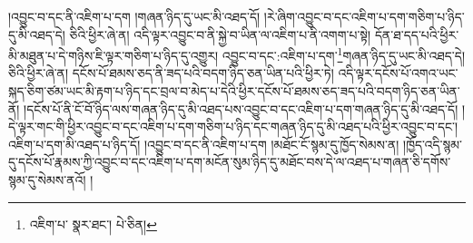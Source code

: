 །འབྱུང་བ་དང་ནི་འཇིག་པ་དག །གཞན་ཉིད་དུ་ཡང་མི་འཐད་དོ། །རེ་ཞིག་འབྱུང་བ་དང་འཇིག་པ་དག་གཅིག་པ་ཉིད་དུ་མི་འཐད་དེ། ཅིའི་ཕྱིར་ཞེ་ན། འདི་ལྟར་འབྱུང་བ་ནི་སྐྱེ་བ་ཡིན་ལ་འཇིག་པ་ནི་འགག་པ་སྟེ། དོན་ཐ་དད་པའི་ཕྱིར་མི་མཐུན་པ་དེ་གཉིས་ཇི་ལྟར་གཅིག་པ་ཉིད་དུ་འགྱུར། འབྱུང་བ་དང་:འཇིག་པ་དག་\footnote{འཇིག་པ་  སྣར་ཐང་།  པེ་ཅིན། }གཞན་ཉིད་དུ་ཡང་མི་འཐད་དེ། ཅིའི་ཕྱིར་ཞེ་ན། དངོས་པོ་ཐམས་ཅད་ནི་ཟད་པའི་བདག་ཉིད་ཅན་ཡིན་པའི་ཕྱིར་ཏེ། འདི་ལྟར་དངོས་པོ་འགའ་ཡང་སྐད་ཅིག་ཙམ་ཡང་མི་རྟག་པ་ཉིད་དང་བྲལ་བ་མེད་པ་དེའི་ཕྱིར་དངོས་པོ་ཐམས་ཅད་ཟད་པའི་བདག་ཉིད་ཅན་ཡིན་ནོ། །དངོས་པོ་ནི་ངོ་བོ་ཉིད་ལས་གཞན་ཉིད་དུ་མི་འཐད་པས་འབྱུང་བ་དང་འཇིག་པ་དག་གཞན་ཉིད་དུ་མི་འཐད་དོ། །དེ་ལྟར་གང་གི་ཕྱིར་འབྱུང་བ་དང་འཇིག་པ་དག་གཅིག་པ་ཉིད་དང་གཞན་ཉིད་དུ་མི་འཐད་པའི་ཕྱིར་འབྱུང་བ་དང་། འཇིག་པ་དག་མི་འཐད་པ་ཉིད་དོ། །འབྱུང་བ་དང་ནི་འཇིག་པ་དག །མཐོང་ངོ་སྙམ་དུ་ཁྱོད་སེམས་ན། །ཁྱོད་འདི་སྙམ་དུ་དངོས་པོ་རྣམས་ཀྱི་འབྱུང་བ་དང་འཇིག་པ་དག་མངོན་སུམ་ཉིད་དུ་མཐོང་བས་དེ་ལ་འཐད་པ་གཞན་ཅི་དགོས་སྙམ་དུ་སེམས་ནའོ། །
